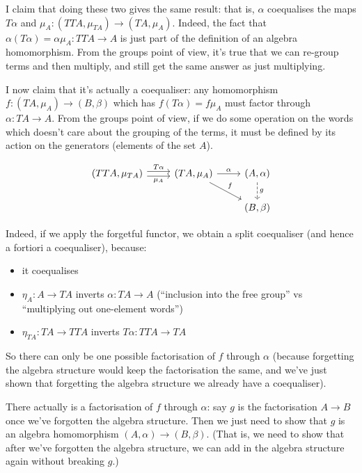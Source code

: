 \documentclass[11pt]{amsart}
\begin{document}
I claim that doing these two gives the same result: that is, $\alpha$ coequalises the maps $T \alpha$ and $\mu_A : (TTA, \mu_{TA}) \to (TA, \mu_A)$.
Indeed, the fact that $\alpha (T \alpha) = \alpha \mu_A : TTA \to A$ is just part of the definition of an algebra homomorphism.
From the groups point of view, it's true that we can re-group terms and then multiply, and still get the same answer as just multiplying.

I now claim that it's actually a coequaliser: any homomorphism $f: (TA, \mu_A) \to (B, \beta)$ which has $f (T \alpha) = f \mu_A$ must factor through $\alpha: TA \to A$.
From the groups point of view, if we do some operation on the words which doesn't care about the grouping of the terms, it must be defined by its action on the generators (elements of the set $A$).

\[
\begin{tikzcd}
(TTA, \mu_{TA}) \arrow[r, shift left, "T\alpha"] \arrow[r, shift right, "\mu_A"']
& (TA, \mu_A)
    \arrow[r, "\alpha"]
    \arrow[dr, "f"]
& (A, \alpha)
    \arrow[d, dashrightarrow, "g"]
\\
&
&
(B, \beta)
\end{tikzcd}
\]

Indeed, if we apply the forgetful functor, we obtain a split coequaliser (and hence a fortiori a coequaliser), because:

\begin{itemize}
\item it coequalises
\item  $\eta_A : A \to TA$ inverts $\alpha: TA \to A$ (``inclusion into the free group'' vs ``multiplying out one-element words'')
\item $\eta_{TA}: TA \to TTA$ inverts $T \alpha: TTA \to TA$
\end{itemize}

So there can only be one possible factorisation of $f$ through $\alpha$ (because forgetting the algebra structure would keep the factorisation the same, and we've just shown that forgetting the algebra structure we already have a coequaliser).

There actually is a factorisation of $f$ through $\alpha$: say $g$ is the factorisation $A \to B$ once we've forgotten the algebra structure.
Then we just need to show that $g$ is an algebra homomorphism $(A, \alpha) \to (B, \beta)$.
(That is, we need to show that after we've forgotten the algebra structure, we can add in the algebra structure again without breaking $g$.)
\end{document}
